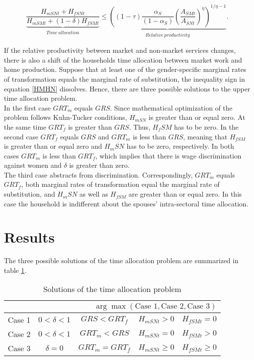 \documentclass[a4paper,12pt]{article}
\begin{document}
\begin{equation} \label{HMHN}
\underbrace{\frac{H_{mSNt} + H_{fSNt}}{H_{mSMt}+(1-\delta)H_{fSMt}}}_{\substack{Time\ allocation}} \leq \underbrace{{\left( (1-\tau) \frac{\alpha_S }{(1-\alpha_S)} {\left( \frac{A_{SMt}}{A_{SNt}}\right)}^{\eta} \right)}^{1/{\eta -1}}}_{\substack{Relative\ productivity}}.
\end{equation}

If the relative productivity between market and non-market services changes, there is also a shift of the households time allocation between market work and home production. Suppose that at least one of the gender-specific marginal rates of transformation equals the marginal rate of substitution, the inequality sign in equation \eqref{HMHN} dissolves. Hence, there are three possible solutions to the upper time allocation problem.\\
In the first case $GRT_m$ equals $GRS$. Since mathematical optimization of the problem follows Kuhn-Tucker conditions, $H_{mSN}$ is greater than or equal zero. At the same time $GRT_f$ is greater than $GRS$. Thus, $H_fSM$ has to be zero. In the second case $GRT_f$ equals $GRS$ and $GRT_m$ is less than $GRS$, meaning that $H_{fSM}$ is greater than or equal zero and $H_mSN$ has to be zero, respectively. In both cases $GRT_m$ is less than $GRT_f$, which implies that there is wage discrimination against women and $\delta$ is greater than zero.\\
The third case abstracts from discrimination. Correspondingly, $GRT_m$ equals $GRT_f$, both marginal rates of transformation equal the marginal rate of substitution, and $H_mSN$ as well as $H_{fSM}$ are greater than or equal zero. In this case the household is indifferent about the spouses' intra-sectoral time allocation.  

\section{Results}

The three possible solutions of the time allocation problem are summarized in table \ref{table:results}.

\begin{table}[h]
\caption{Solutions of the time allocation problem}
\label{table:results}
\begin{tabular}{lcccc} \hline
 \multicolumn{5}{r}{$\arg \max (\mbox{Case 1},\mbox{Case 2},\mbox{Case 3})$}  \\ \hline \hline
 
 \rule[-3mm]{0pt}{20pt}Case 1 & $0<\delta<1$ & $GRS<GRT_f$ & $H_{mSNt}>0$ & $H_{fSMt}=0$ \\ \hline %
 \rule[-3mm]{0pt}{20pt}Case 2 & $0<\delta<1$ & $GRT_m<GRS$ & $H_{mSNt}=0$ & $H_{fSMt}>0$ \\ \hline %
 \rule[-3mm]{0pt}{20pt}Case 3 & $\delta=0$ & $GRT_m=GRT_f$ & $H_{mSNt}\geq0$ & $H_{fSMt}\geq0$  \\ \hline %

\end{tabular}

\end{table}
\end{document}
